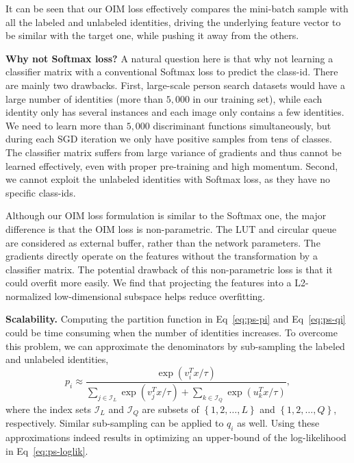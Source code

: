 It can be seen that our OIM loss effectively compares the mini-batch sample with all the labeled and unlabeled identities, driving the underlying feature vector to be similar with the target one, while pushing it away from the others.

\textbf{Why not Softmax loss?} A natural question here is that why not learning a classifier matrix with a conventional Softmax loss to predict the class-id. There are mainly two drawbacks. First, large-scale person search datasets would have a large number of identities (more than $5,000$ in our training set), while each identity only has several instances and each image only contains a few identities. We need to learn more than $5,000$ discriminant functions simultaneously, but during each SGD iteration we only have positive samples from tens of classes. The classifier matrix suffers from large variance of gradients and thus cannot be learned effectively, even with proper pre-training and high momentum. Second, we cannot exploit the unlabeled identities with Softmax loss, as they have no specific class-ids.

Although our OIM loss formulation is similar to the Softmax one, the major difference is that the OIM loss is non-parametric. The LUT and circular queue are considered as external buffer, rather than the network parameters. The gradients directly operate on the features without the transformation by a classifier matrix. The potential drawback of this non-parametric loss is that it could overfit more easily. We find that projecting the features into a L2-normalized low-dimensional subspace helps reduce overfitting.

\textbf{Scalability.} Computing the partition function in Eq~\eqref{eq:ps-pi} and Eq~\eqref{eq:ps-qi} could be time consuming when the number of identities increases. To overcome this problem, we can approximate the denominators by sub-sampling the labeled and unlabeled identities,
\begin{equation} \label{eq:ps-pi-sub}
p_i\approx\frac{\exp(v_i^Tx/\tau)}{\sum_{j\in\mathcal{I}_L}\exp(v_j^Tx/\tau)+\sum_{k\in\mathcal{I}_Q}\exp(u_k^Tx/\tau)},
\end{equation}
where the index sets $\mathcal{I}_L$ and $\mathcal{I}_Q$ are subsets of $\left\{1,2,\dots,L\right\}$ and $\left\{1,2,\dots,Q\right\}$, respectively. Similar sub-sampling can be applied to $q_i$ as well. Using these approximations indeed results in optimizing an upper-bound of the log-likelihood in Eq~\eqref{eq:ps-loglik}.

